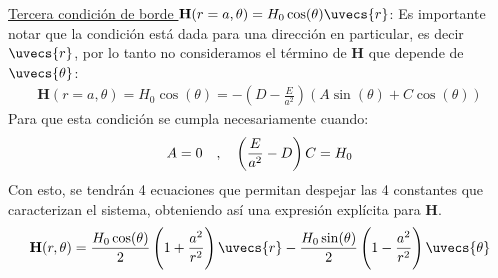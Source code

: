 \documentclass[
  11pt,
  letterpaper,
   answers
  ]{exam}
\begin{document}
\begin{questions}
\begin{solution}
\begin{parts}
    \uline{Tercera condición de borde $\mathbf{H}(r=a,\theta) = H_{0}\cos(\theta) \uvecs{r}$}: Es importante notar que la condición está dada para una dirección en particular, es decir $\uvecs{r}$, por lo tanto no consideramos el término de $\mathbf{H}$ que depende de $\uvecs{\theta}$: 
    \begin{align}
        \mathbf{H}(r=a,\theta) = H_{0}\cos(\theta)  = -\left(D- \frac{E}{a^{2}}\right)(A\sin(\theta) + C \cos(\theta)) 
    \end{align}
    Para que esta condición se cumpla necesariamente cuando:
    \begin{align}
            A=0 \quad,\quad \del{\frac{E}{a^2}-D}C = H_{0}
    \end{align}
    Con esto, se tendrán 4 ecuaciones que permitan despejar las 4 constantes que caracterizan el sistema, obteniendo así una expresión explícita para $\mathbf{H}$.
    \begin{align}
        \mathbf{H}(r,\theta) = \frac{H_{0}\cos(\theta)}{2}\del{1 + \frac{a^{2}}{r^2}} \uvecs{r} - \frac{H_{0}\sin(\theta)}{2} \del{1 - \frac{a^{2}}{r^2}} \uvecs{\theta}
    \end{align}
    \end{parts}
    
  \end{solution}

\end{questions}
\end{document}
